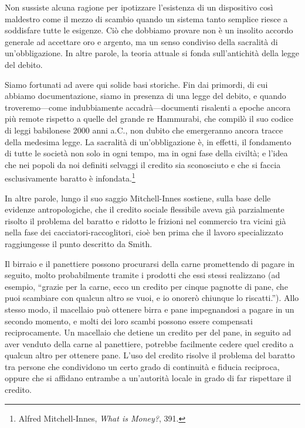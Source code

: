 \documentclass[
  a5paper,
  smalldemyvopaper,10pt,twoside,onecolumn,openright,extrafontsizes,hidelinks]{memoir}
\renewenvironment{quote}%
               {\list{}{\rightmargin=.6cm\leftmargin=.6cm}%
                \itshape \item[]}%
               {\endlist}
\begin{document}
\begin{quote}
Non sussiste alcuna ragione per ipotizzare l'esistenza di un dispositivo
così maldestro come il mezzo di scambio quando un sistema tanto semplice
riesce a soddisfare tutte le esigenze. Ciò che dobbiamo provare non è un
insolito accordo generale ad accettare oro e argento, ma un senso
condiviso della sacralità di un'obbligazione. In altre parole, la teoria
attuale si fonda sull'antichità della legge del debito.
\end{quote}

\begin{quote}
Siamo fortunati ad avere qui solide basi storiche. Fin dai primordi, di
cui abbiamo documentazione, siamo in presenza di una legge del debito, e
quando troveremo---come indubbiamente accadrà---documenti risalenti a
epoche ancora più remote rispetto a quelle del grande re Hammurabi, che
compilò il suo codice di leggi babilonese 2000 anni a.C., non dubito che
emergeranno ancora tracce della medesima legge. La sacralità di
un'obbligazione è, in effetti, il fondamento di tutte le società non
solo in ogni tempo, ma in ogni fase della civiltà; e l'idea che nei
popoli da noi definiti selvaggi il credito sia sconosciuto e che si
faccia esclusivamente baratto è infondata.\footnote{Alfred
  Mitchell-Innes, \emph{What is Money?}, 391.}
\end{quote}

In altre parole, lungo il suo saggio Mitchell-Innes sostiene, sulla base
delle evidenze antropologiche, che il credito sociale flessibile aveva
già parzialmente risolto il problema del baratto e ridotto le frizioni
nel commercio tra vicini già nella fase dei cacciatori-raccoglitori,
cioè ben prima che il lavoro specializzato raggiungesse il punto
descritto da Smith.

Il birraio e il panettiere possono procurarsi della carne promettendo di
pagare in seguito, molto probabilmente tramite i prodotti che essi
stessi realizzano (ad esempio, ``grazie per la carne, ecco un credito
per cinque pagnotte di pane, che puoi scambiare con qualcun altro se
vuoi, e io onorerò chiunque lo riscatti.''). Allo stesso modo, il
macellaio può ottenere birra e pane impegnandosi a pagare in un secondo
momento, e molti dei loro scambi possono essere compensati
reciprocamente. Un macellaio che detiene un credito per del pane, in
seguito ad aver venduto della carne al panettiere, potrebbe facilmente
cedere quel credito a qualcun altro per ottenere pane. L'uso del credito
risolve il problema del baratto tra persone che condividono un certo
grado di continuità e fiducia reciproca, oppure che si affidano entrambe
a un'autorità locale in grado di far rispettare il credito.
\end{document}
